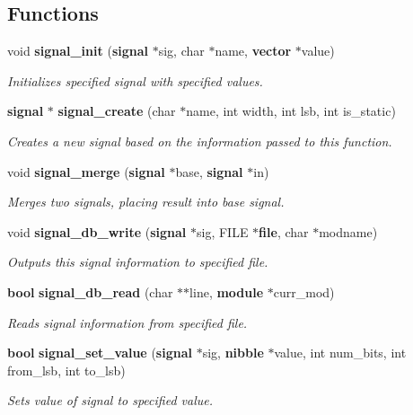 \subsection*{Functions}
\begin{CompactItemize}
\item 
void {\bf signal\_\-init} ({\bf signal} $\ast$sig, char $\ast$name, {\bf vector} $\ast$value)
\begin{CompactList}\small\item\em Initializes specified signal with specified values.\item\end{CompactList}\item 
{\bf signal} $\ast$ {\bf signal\_\-create} (char $\ast$name, int width, int lsb, int is\_\-static)
\begin{CompactList}\small\item\em Creates a new signal based on the information passed to this function.\item\end{CompactList}\item 
void {\bf signal\_\-merge} ({\bf signal} $\ast$base, {\bf signal} $\ast$in)
\begin{CompactList}\small\item\em Merges two signals, placing result into base signal.\item\end{CompactList}\item 
void {\bf signal\_\-db\_\-write} ({\bf signal} $\ast$sig, FILE $\ast${\bf file}, char $\ast$modname)
\begin{CompactList}\small\item\em Outputs this signal information to specified file.\item\end{CompactList}\item 
{\bf bool} {\bf signal\_\-db\_\-read} (char $\ast$$\ast$line, {\bf module} $\ast$curr\_\-mod)
\begin{CompactList}\small\item\em Reads signal information from specified file.\item\end{CompactList}\item 
{\bf bool} {\bf signal\_\-set\_\-value} ({\bf signal} $\ast$sig, {\bf nibble} $\ast$value, int num\_\-bits, int from\_\-lsb, int to\_\-lsb)
\begin{CompactList}\small\item\em Sets value of signal to specified value.\item\end{CompactList}\item 
$$
\end{CompactItemize}
